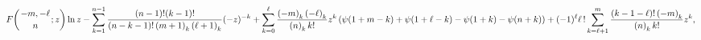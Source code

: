 \[\mathop{F\/}\nolimits\!\left({-m,-\ell\atop n};z\right)\mathop{\ln\/}\nolimits
z%
-\sum_{k=1}^{n-1}\frac{(n-1)!(k-1)!}{(n-k-1)!\left(m+1\right)_{k}\left(\ell+1%
\right)_{k}}(-z)^{-k}+\sum_{k=0}^{\ell}\frac{\left(-m\right)_{k}\left(-\ell%
\right)_{k}}{\left(n\right)_{k}k!}z^{k}\left(\mathop{\psi\/}\nolimits\!\left(1%
+m-k\right)+\mathop{\psi\/}\nolimits\!\left(1+\ell-k\right)-\mathop{\psi\/}%
\nolimits\!\left(1+k\right)-\mathop{\psi\/}\nolimits\!\left(n+k\right)\right)+%
(-1)^{\ell}\ell\,!\sum_{k=\ell+1}^{m}\frac{(k-1-\ell)!\left(-m\right)_{k}}{%
\left(n\right)_{k}k!}z^{k},\]